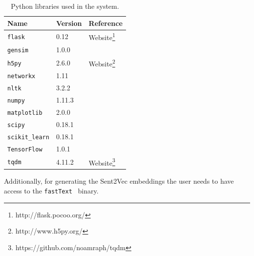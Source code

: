 \begin{table}[H]
	\centering
	\small
	\begin{adjustbox}{max width=\textwidth}
		\begin{tabular}{lll}
			\toprule
			Name & Version & Reference \\
			\midrule
			\texttt{flask} & 0.12 & Website\protect\footnote{http://flask.pocoo.org/}\\
			\texttt{gensim} & 1.0.0 & \cite{Radim:2010}\\
			\texttt{h5py} & 2.6.0 & Website\protect\footnote{http://www.h5py.org/}\\
			\texttt{networkx} & 1.11 & \cite{Hagberg:2008}\\
			\texttt{nltk} & 3.2.2 & \cite{Bird:2009}\\
			\texttt{numpy} & 1.11.3 & \cite{Walt:2011}\\
			\texttt{matplotlib} & 2.0.0 & \cite{Hunter:2007}\\
			\texttt{scipy} & 0.18.1 & \cite{Jones:2014}\\
			\texttt{scikit\_learn} & 0.18.1 & \cite{Thidus:2016}\\
			\texttt{TensorFlow} & 1.0.1 & \cite{TensorFlow:2015}\\
			\texttt{tqdm} & 4.11.2 & Website\protect\footnote{https://github.com/noamraph/tqdm}\\
			\bottomrule
		\end{tabular}
	\end{adjustbox}
	\caption{Python libraries used in the system.}
\end{table}

Additionally, for generating the Sent2Vec embeddings the user needs to have access to the \texttt{fastText}~\cite{Bojanowski:2016} binary.
